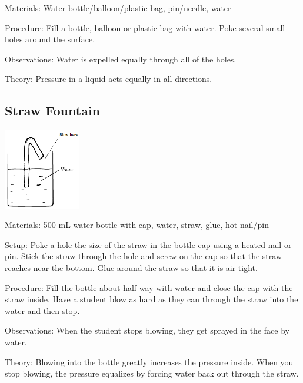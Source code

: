 \begin{multicols}{2}
\begin{description*}
\item[Materials:]{Water bottle/balloon/plastic bag, pin/needle, water}
\item[Procedure:]{Fill a bottle, balloon or plastic bag with water. Poke several small holes around the surface.}
\item[Observations:]{Water is expelled equally through all of the holes.}
\item[Theory:]{Pressure in a liquid acts equally in all directions.}
\end{description*}

\subsection{Straw Fountain}

\begin{center}
\includegraphics[width=0.25\textwidth]{./img/straw-fountain.png}
\end{center}

\begin{description*}
\item[Materials:]{500 mL water bottle with cap, water, straw, glue, hot nail/pin}
\item[Setup:]{Poke a hole the size of the straw in the bottle cap using a heated nail or pin. Stick the straw through the hole and screw on the cap so that the straw reaches near the bottom. Glue around the straw so that it is air tight.}
\item[Procedure:]{Fill the bottle about half way with water and close the cap with the straw inside. Have a student blow as hard as they can through the straw into the water and then stop.}
\item[Observations:]{When the student stops blowing, they get sprayed in the face by water.}
\item[Theory:]{Blowing into the bottle greatly increases the pressure inside. When you stop blowing, the pressure equalizes by forcing water back out through the straw.}
\end{description*}


\end{multicols}
